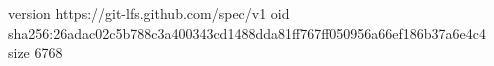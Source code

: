 version https://git-lfs.github.com/spec/v1
oid sha256:26adac02c5b788c3a400343cd1488dda81ff767ff050956a66ef186b37a6e4c4
size 6768
